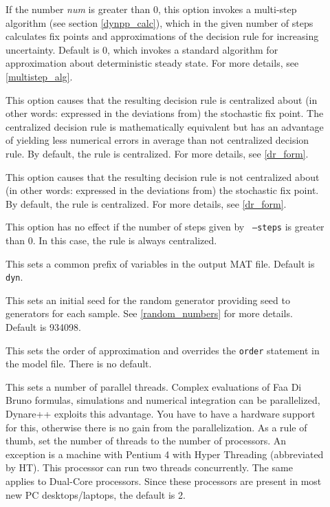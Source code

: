 \documentclass[10pt]{article}
\begin{document}
\begin{description}
\item[] If the number {\it num} is greater
than 0, this option invokes a multi-step algorithm (see section
\ref{dynpp_calc}), which in the given number of steps calculates fix
points and approximations of the decision rule for increasing
uncertainty. Default is 0, which invokes a standard algorithm for
approximation about deterministic steady state. For more details,
see \ref{multistep_alg}.

\item[] This option causes that the resulting
decision rule is centralized about (in other words: expressed in the
deviations from) the stochastic fix point. The centralized decision
rule is mathematically equivalent but has an advantage of yielding
less numerical errors in average than not centralized decision
rule. By default, the rule is centralized. For more details, see
\ref{dr_form}.

\item[] This option causes that the
resulting decision rule is not centralized about (in other words:
expressed in the deviations from) the stochastic fix point. By
default, the rule is centralized. For more details, see
\ref{dr_form}.

This option has no effect if the number of steps given by {\tt
--steps} is greater than 0. In this case, the rule is always
centralized.

\item[] This sets a common prefix of
variables in the output MAT file. Default is {\tt dyn}.

\item[] This sets an initial seed for the
random generator providing seed to generators for each sample. See
\ref{random_numbers} for more details. Default is 934098.

\item[] This sets the order of approximation
and overrides the {\tt order} statement in the model file. There is no
default.

\item[] This sets a number of parallel
threads. Complex evaluations of Faa Di Bruno formulas, simulations and
numerical integration can be parallelized, Dynare++ exploits this
advantage. You have to have a hardware support for this, otherwise
there is no gain from the parallelization. As a rule of thumb, set the
number of threads to the number of processors. An exception is a
machine with Pentium 4 with Hyper Threading (abbreviated by HT). This
processor can run two threads concurrently. The same applies to
Dual-Core processors. Since these processors are present in most new
PC desktops/laptops, the default is 2.


\end{description}
\end{document}
